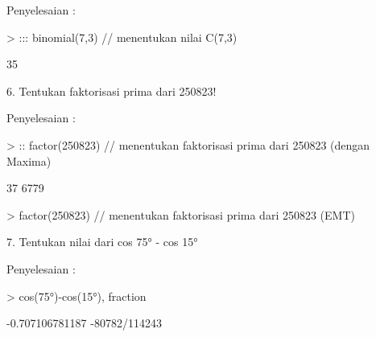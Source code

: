 \begin{eulernotebook}
\begin{eulercomment}
        Penyelesaian :
    \end{eulercomment}
    \begin{eulerprompt}
> ::: binomial(7,3) // menentukan nilai C(7,3)
    \end{eulerprompt}
    \begin{euleroutput}
      
                                    35
  
    \end{euleroutput}
    \eulersubheading{}
    \begin{eulercomment}
        6. Tentukan faktorisasi prima dari 250823!
        
        Penyelesaian :
    \end{eulercomment}
    \begin{eulerprompt}
> :: factor(250823) // menentukan faktorisasi prima dari 250823 (dengan Maxima) 
    \end{eulerprompt}
    \begin{euleroutput}
  
                                 37 6779
  
    \end{euleroutput}
    \begin{eulerprompt}
> factor(250823) // menentukan faktorisasi prima dari 250823 (EMT)
    \end{eulerprompt}
    \begin{euleroutput}
  [37,  6779]
    \end{euleroutput}

    \eulersubheading{}
    \begin{eulercomment}
        7. Tentukan nilai dari cos 75° - cos 15°
        
        Penyelesaian :
    \end{eulercomment}
    \begin{eulerprompt}
> cos(75°)-cos(15°), fraction %
    \end{eulerprompt}
    \begin{euleroutput}
  -0.707106781187
  -80782/114243
    \end{euleroutput}


\end{eulernotebook}
